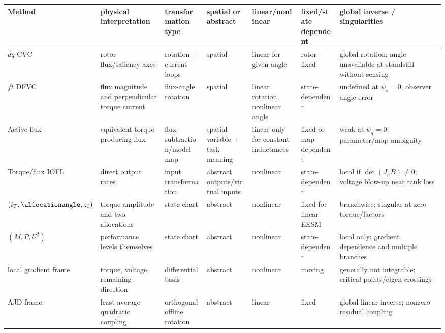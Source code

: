 \begin{landscape}
\begin{standalonetable}
\label{tab:coordinate-comparison-structural}
\begin{tabularx}{\linewidth}{lXXXXXX}
\toprule
Method & physical interpretation & transformation type & spatial or abstract
& linear/nonlinear & fixed/state dependent & global inverse / singularities\\
\midrule
\(dq\) CVC & rotor flux/saliency axes & rotation + current loops & spatial &
linear for given angle & rotor-fixed & global rotation; angle unavailable at standstill without sensing\\
\(ft\) DFVC & flux magnitude and perpendicular torque current & flux-angle rotation & spatial &
linear rotation, nonlinear angle & state-dependent & undefined at \(\psi_s=0\); observer angle error\\
Active flux & equivalent torque-producing flux & flux subtraction/model map & spatial variable + task meaning &
linear only for constant inductances & fixed or map-dependent & weak at \(\psi_a=0\); parameter/map ambiguity\\
Torque/flux IOFL & direct output rates & input transformation & abstract outputs/virtual inputs &
nonlinear & state-dependent & local if \(\det(J_hB)\ne0\); voltage blow-up near rank loss\\
\((i_T,\allocationangle,z_0)\) & torque amplitude and two allocations & state chart & abstract &
nonlinear & fixed for linear EESM & branchwise; singular at zero torque/factors\\
\((M,P,U^2)\) & performance levels themselves & state chart & abstract &
nonlinear & state-dependent & local only; gradient dependence and multiple branches\\
local gradient frame & torque, voltage, remaining direction & differential basis & abstract &
nonlinear & moving & generally not integrable; critical points/eigen crossings\\
AJD frame & least average quadratic coupling & orthogonal offline rotation & abstract &
linear & fixed & global linear inverse; nonzero residual coupling\\
\bottomrule
\end{tabularx}
\end{standalonetable}
\end{landscape}

